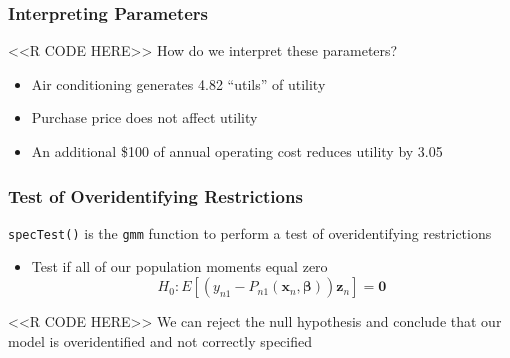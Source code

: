 \documentclass{beamer}
\begin{document}
\begin{frame}[fragile]\frametitle{Interpreting Parameters}
    <<R CODE HERE>>
    \vspace{2ex}
    How do we interpret these parameters?
    \begin{itemize}
        \item Air conditioning generates 4.82 ``utils'' of utility
        \item Purchase price does not affect utility
        \item An additional \$100 of annual operating cost reduces utility by 3.05
    \end{itemize}
\end{frame}

\begin{frame}[fragile]\frametitle{Test of Overidentifying Restrictions}
	\texttt{specTest()} is the \texttt{gmm} function to perform a test of overidentifying restrictions
	\begin{itemize}
		\item Test if all of our population moments equal zero
		$$H_0: E[\left( y_{n1} - P_{n1}(\bm{x}_n, \bm{\beta}) \right) \bm{z}_n] = \bm{0}$$
	\end{itemize}
    <<R CODE HERE>>
    \vspace{2ex}
    We can reject the null hypothesis and conclude that our model is overidentified and not correctly specified
\end{frame}
\end{document}
